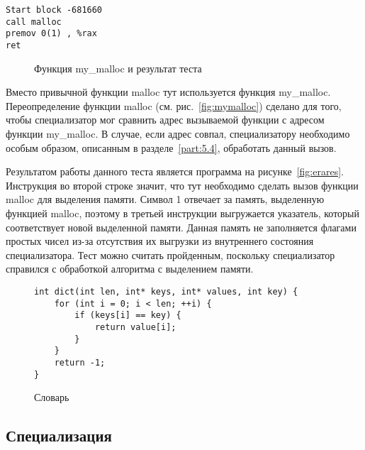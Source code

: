 \newsavebox\boxtw
\begin{lrbox}{\boxtw}
\begin{lstlisting}[xleftmargin = 20pt]
Start block -681660
call malloc
premov 0(1) , %rax 
ret
\end{lstlisting}
\end{lrbox}

\begin{figure}[!t]
\hfill
{}
\caption{Функция my\_malloc и результат теста}
\end{figure}

Вместо привычной функции \textsf{malloc} тут используется функция \textsf{my\_malloc}.
Переопределение функции \textsf{malloc} (см. рис.~\ref{fig:mymalloc}) сделано для того, чтобы специализатор мог сравнить адрес
вызываемой функции с адресом функции \textsf{my\_malloc}.
В случае, если адрес совпал, специализатору необходимо особым образом, описанным в разделе~\ref{part:5.4}, обработать данный вызов.

Результатом работы данного теста является программа на рисунке~\ref{fig:erares}.
Инструкция во второй строке значит, что тут необходимо сделать вызов функции \textsf{malloc} для выделения памяти.
Символ \textsf{1} отвечает за память, выделенную функцией \textsf{malloc}, поэтому в третьей инструкции выгружается указатель,
который соответствует новой выделенной памяти.
Данная память не заполняется флагами простых чисел из-за отсутствия их выгрузки из внутреннего состояния специализатора.
Тест можно считать пройденным, поскольку специализатор справился с обработкой алгоритма с выделением памяти.

\begin{figure}[t]
\begin{lstlisting}[xleftmargin = 20pt]
int dict(int len, int* keys, int* values, int key) {
    for (int i = 0; i < len; ++i) {
        if (keys[i] == key) {
            return value[i];
        }
    }
    return -1;
}
\end{lstlisting}
\caption{ Словарь}
\label{fig:dict}
\end{figure}

\subsection{Специализация}


